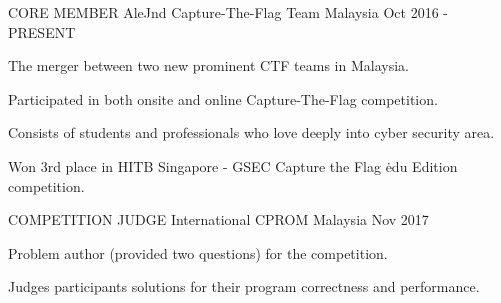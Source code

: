 

\begin{cventries}

    \cventry
    {CORE MEMBER}
    {AleJnd Capture-The-Flag Team}
    {Malaysia}
    {Oct 2016 - PRESENT}
    {
      \begin{cvitems}
        \item {The merger between two new prominent CTF teams in Malaysia.}
        \item {Participated in both onsite and online Capture-The-Flag competition.}
        \item {Consists of students and professionals who love deeply into cyber security area.}
        \item {Won 3rd place in HITB Singapore - GSEC Capture the Flag \.edu Edition competition.}
      \end{cvitems}
    }

    \cventry
    {COMPETITION JUDGE}
    {International CPROM}
    {Malaysia}
    {Nov 2017}
    {
      \begin{cvitems}
        \item {Problem author (provided two questions) for the competition.}
        \item {Judges participants solutions for their program correctness and performance.}
      \end{cvitems}
    }
\end{cventries}
